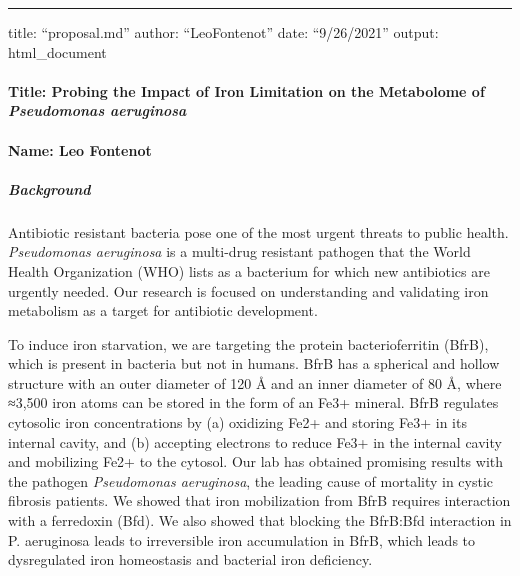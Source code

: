 \documentclass[
]{article}
\author{}
\date{\vspace{-2.5em}}
\begin{document}
\begin{center}\rule{0.5\linewidth}{0.5pt}\end{center}

title: ``proposal.md'' author: ``LeoFontenot'' date: ``9/26/2021''
output: html\_document

\hypertarget{title-probing-the-impact-of-iron-limitation-on-the-metabolome-of-pseudomonas-aeruginosa}{%
\paragraph{\texorpdfstring{Title: Probing the Impact of Iron Limitation
on the Metabolome of \emph{Pseudomonas
aeruginosa}}{Title: Probing the Impact of Iron Limitation on the Metabolome of Pseudomonas aeruginosa}}\label{title-probing-the-impact-of-iron-limitation-on-the-metabolome-of-pseudomonas-aeruginosa}}

\hypertarget{name-leo-fontenot}{%
\paragraph{Name: Leo Fontenot}\label{name-leo-fontenot}}

\hypertarget{background}{%
\subparagraph{Background}\label{background}}

Antibiotic resistant bacteria pose one of the most urgent threats to
public health. \emph{Pseudomonas aeruginosa} is a multi-drug resistant
pathogen that the World Health Organization (WHO) lists as a bacterium
for which new antibiotics are urgently needed. Our research is focused
on understanding and validating iron metabolism as a target for
antibiotic development.

To induce iron starvation, we are targeting the protein bacterioferritin
(BfrB), which is present in bacteria but not in humans. BfrB has a
spherical and hollow structure with an outer diameter of 120 Å and an
inner diameter of 80 Å, where ≈3,500 iron atoms can be stored in the
form of an Fe3+ mineral. BfrB regulates cytosolic iron concentrations by
(a) oxidizing Fe2+ and storing Fe3+ in its internal cavity, and (b)
accepting electrons to reduce Fe3+ in the internal cavity and mobilizing
Fe2+ to the cytosol. Our lab has obtained promising results with the
pathogen \emph{Pseudomonas aeruginosa}, the leading cause of mortality
in cystic fibrosis patients. We showed that iron mobilization from BfrB
requires interaction with a ferredoxin (Bfd). We also showed that
blocking the BfrB:Bfd interaction in P. aeruginosa leads to irreversible
iron accumulation in BfrB, which leads to dysregulated iron homeostasis
and bacterial iron deficiency.
\end{document}
